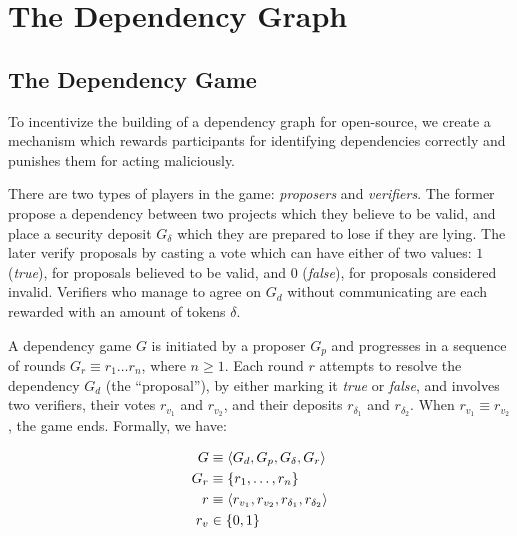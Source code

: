 \section{The Dependency Graph}
\subsection{The Dependency Game}


To incentivize the building of a dependency graph for open-source, we create a
mechanism which rewards participants for identifying dependencies correctly and
punishes them for acting maliciously.

There are two types of players in the game: \emph{proposers} and
\emph{verifiers}.  The former propose a dependency between two projects which
they believe to be valid, and place a security deposit $G_{\delta}$ which they
are prepared to lose if they are lying. The later verify proposals by casting a
vote which can have either of two values: $1$ (\emph{true}), for proposals
believed to be valid, and $0$ (\emph{false}), for proposals considered
invalid. Verifiers who manage to agree on $G_d$ without communicating
are each rewarded with an amount of tokens $\delta$.


A dependency game $G$ is initiated by a proposer $G_p$ and progresses in a
sequence of rounds $G_r \equiv r_1 \dots r_n$, where $n \geqslant 1$. Each
round $r$ attempts to resolve the dependency $G_d$ (the ``proposal''), by
either marking it \emph{true} or \emph{false}, and involves two verifiers,
their votes $r_{v_1}$ and $r_{v_2}$, and their deposits $r_{\delta_1}$ and
$r_{\delta_2}$. When $r_{v_1} \equiv r_{v_2}$, the game ends.  Formally, we
have:

\begin{align*}
    G      & \equiv \langle G_d, G_p, G_{\delta}, G_r \rangle \\
    G_r    & \equiv \{r_1, \dots, r_n\} \\
    r      & \equiv \langle r_{v_1}, r_{v_2}, r_{\delta_1}, r_{\delta_2} \rangle \\
    r_v    & \in \{0, 1\} \\
\end{align*}



